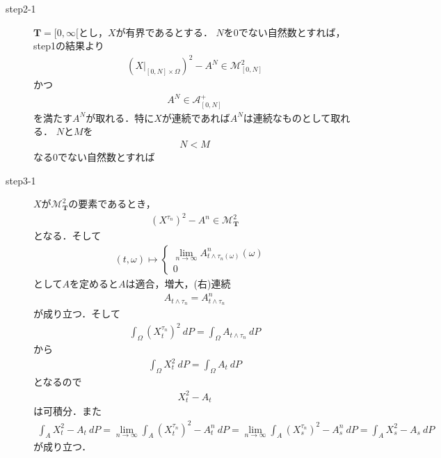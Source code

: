 \begin{sketch}
\begin{description}
			\item[step2-1]
				$\mathbf{T}=[0,\infty[$とし，$X$が有界であるとする．
				$N$を$0$でない自然数とすれば，step1の結果より
				\begin{align}
					\left(X|_{[0,N] \times \Omega}\right)^2 - A^N \in \mathscr{M}^2_{[0,N]}
				\end{align}
				かつ
				\begin{align}
					A^N \in \mathscr{A}^+_{[0,N]}
				\end{align}
				を満たす$A^N$が取れる．特に$X$が連続であれば$A^N$は連続なものとして取れる．
				$N$と$M$を
				\begin{align}
					N < M
				\end{align}
				なる$0$でない自然数とすれば
				
			\item[step3-1]
				$X$が$\mathscr{M}^2_{\mathbf{T}}$の要素であるとき，
				\begin{align}
					\left(X^{\tau_n}\right)^2 - A^n \in \mathscr{M}^2_{\mathbf{T}}
				\end{align}
				となる．そして
				\begin{align}
					(t,\omega) \longmapsto
					\begin{cases}
						\lim_{n \to \infty} A^n_{t \wedge \tau_n(\omega)}(\omega) & \\
						0
					\end{cases}
				\end{align}
				として$A$を定めると$A$は適合，増大，(右)連続
				\begin{align}
					A_{t \wedge \tau_n} = A^n_{t \wedge \tau_n}
				\end{align}
				が成り立つ．そして
				\begin{align}
					\int_\Omega \left(X^{\tau_n}_t\right)^2\ dP = \int_\Omega A_{t \wedge \tau_n}\ dP
				\end{align}
				から
				\begin{align}
					\int_\Omega X_t^2\ dP = \int_\Omega A_t\ dP
				\end{align}
				となるので
				\begin{align}
					X_t^2 - A_t
				\end{align}
				は可積分．また
				\begin{align}
					\int_A X_t^2 - A_t\ dP
					= \lim_{n \to \infty} \int_A \left(X^{\tau_n}_t\right)^2 - A^n_t\ dP
					= \lim_{n \to \infty} \int_A \left(X^{\tau_n}_s\right)^2 - A^n_s\ dP
					= \int_A X_s^2 - A_s\ dP
				\end{align}
				が成り立つ．
				\QED
		\end{description}
	\end{sketch}
	
